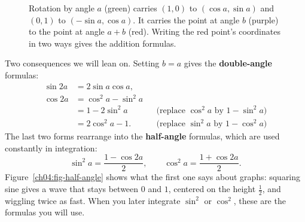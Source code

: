 \begin{figure}[htbp]
\centering
{}
\caption{Rotation by angle $a$ (green) carries $(1,0)$ to $(\cos a,\sin a)$ and $(0,1)$ to $(-\sin a,\cos a)$. It carries the point at angle $b$ (purple) to the point at angle $a+b$ (red). Writing the red point's coordinates in two ways gives the addition formulas.}
\label{ch04:fig-rotation}
\end{figure}

Two consequences we will lean on. Setting $b = a$ gives the \textbf{double-angle} formulas:
\begin{align*}
  \sin 2a &= 2\sin a\cos a,\\
  \cos 2a &= \cos^2 a - \sin^2 a\\
          &= 1 - 2\sin^2 a &&\text{(replace $\cos^2 a$ by $1-\sin^2 a$)}\\
          &= 2\cos^2 a - 1. &&\text{(replace $\sin^2 a$ by $1-\cos^2 a$)}
\end{align*}
The last two forms rearrange into the \textbf{half-angle} formulas, which are used constantly in integration:
\[
  \sin^2 a = \frac{1 - \cos 2a}{2},\qquad
  \cos^2 a = \frac{1 + \cos 2a}{2}.
\]
Figure~\ref{ch04:fig-half-angle} shows what the first one says about graphs: squaring sine gives a wave that stays between $0$ and $1$, centered on the height $\tfrac12$, and wiggling twice as fast. When you later integrate $\sin^2$ or $\cos^2$, these are the formulas you will use.


